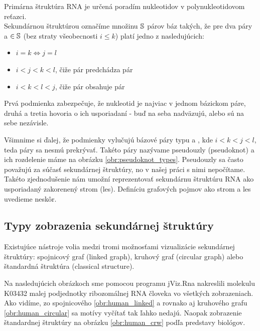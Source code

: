 \begin{definice}
  \label{def:RNA_sekundarna_struktura}
  Primárna štruktúra RNA je určená poradím nukleotidov v polynukleotidovom reťazci.
  \\
  Sekundárnou štruktúrou označíme množinu $\mathbb{S}$ párov báz  takých,
  že pre dva páry  a  $\in \mathbb{S}$ (bez straty všeobecnosti $i \leq k$)
  platí jedno z nasledujúcich:
  \begin{itemize}
    \item $i = k \iff j = l$
    \item $i < j < k < l$, čiže pár  predchádza pár 
    \item $i < k < l < j$, čiže pár  obsahuje pár 
  \end{itemize}
\end{definice}

Prvá podmienka zabezpečuje, že nukleotid je najviac v jednom bázickom páre,
druhá a tretia hovoria o ich usporiadaní - buď na seba nadväzujú, alebo
sú na sebe nezávisle.

Všimnime si ďalej, že podmienky vylučujú bázové páry typu  a ,
kde $i < k < j < l$, teda páry sa nesmú prekrývať. Takéto páry nazývame
pseudouzly (pseudoknot) a ich rozdelenie máme na obrázku \ref{obr:pseudoknot_types}.
Pseudouzly sa často považujú za súčasť sekundárnej štruktúry, no v našej práci
s nimi nepočítame. Takéto zjednodušenie nám umožní reprezentovať sekundárnu
štruktúru RNA ako usporiadaný zakorenený strom (les). Definíciu grafových
pojmov ako strom a les uvedieme neskôr.

\subsection{Typy zobrazenia sekundárnej štruktúry}

Existujúce nástroje volia medzi tromi možnosťami vizualizácie sekundárnej
štruktúry: spojnicový graf (linked graph), kruhový graf (circular graph)
alebo štandardná štruktúra (classical structure).

Na nasledujúcich obrázkoch sme pomocou programu jViz.Rna 
nakreslili molekulu K03432 malej podjednotky ribozomálnej RNA človeka
vo všetkých zobrazeniach.
Ako vidíme, zo spojnicového \ref{obr:human_linked} a rovnako aj kruhového
grafu \ref{obr:human_circular} sa motívy vyčítať tak ľahko nedajú.
Naopak zobrazenie štandardnej štruktúry na obrázku \ref{obr:human_crw}
podľa predstavy biológov.

